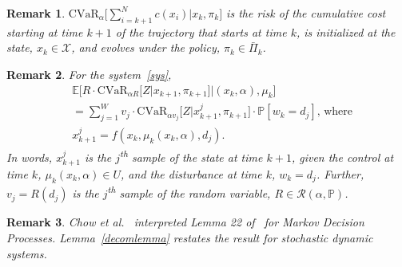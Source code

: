 \documentclass[letterpaper, 10 pt, conference]{ieeeconf}  %
\newtheorem{remark}{Remark}
\begin{document}
%
\begin{remark}
$\text{CVaR}_\alpha \big[ \textstyle \sum_{i=k+1}^N c(x_i) \big| x_k, \pi_k \big]$ is the risk of 
the cumulative cost starting at time $k+1$ of the trajectory that starts at time $k$, is initialized at the state, $x_k \in \mathcal{X}$, 
and evolves under the policy, $\pi_k \in \bar{\Pi}_k$.
\end{remark}
%
\begin{remark}
For the system~\eqref{sys},
\begin{equation*}\begin{aligned}
& \mathbb{E}\Big[ R \cdot \text{CVaR}_{\alpha R}\big[ Z \big| x_{k+1}, \pi_{k+1} \big] \Big| (x_k, \alpha), \mu_k \Big] \\
& = \textstyle\sum_{j=1}^W v_j \cdot \text{CVaR}_{\alpha v_j}\big[ Z \big| x_{k+1}^j, \pi_{k+1} \big] \cdot \mathbb{P}[w_k = d_j]\text{, where}\\
& x_{k+1}^j = f(x_k, \mu_k(x_k, \alpha), d_j).
\end{aligned}\end{equation*}
%
In words, $x_{k+1}^j$ is the $j$\textsuperscript{th} sample of the state at time $k+1$, given the control at time $k$, $\mu_k(x_k, \alpha) \in U$, 
and the disturbance at time $k$, $w_k = d_j$.
Further, $v_j = R(d_j)$ is the $j$\textsuperscript{th} sample of the random variable, $R \in \mathcal{R}(\alpha, \mathbb{P})$. 
\end{remark}
%
\begin{remark}
Chow et al.~\cite{chow2015risk} interpreted Lemma 22 of~\cite{pflug2016time} for Markov Decision Processes.
Lemma~\ref{decomlemma} restates the result for stochastic dynamic systems.
\end{remark}
\end{document}
